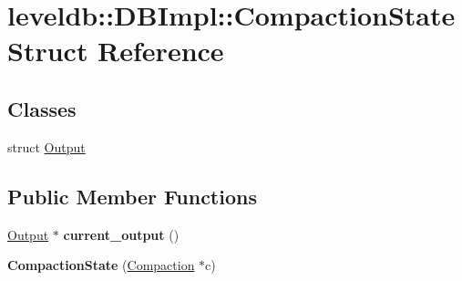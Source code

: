 \hypertarget{structleveldb_1_1_d_b_impl_1_1_compaction_state}{}\section{leveldb\+:\+:D\+B\+Impl\+:\+:Compaction\+State Struct Reference}
\label{structleveldb_1_1_d_b_impl_1_1_compaction_state}
\subsection*{Classes}
\begin{DoxyCompactItemize}
\item 
struct \mbox{\hyperlink{structleveldb_1_1_d_b_impl_1_1_compaction_state_1_1_output}{Output}}
\end{DoxyCompactItemize}
\subsection*{Public Member Functions}
\begin{DoxyCompactItemize}
\item 
\mbox{\label{structleveldb_1_1_d_b_impl_1_1_compaction_state_ac371d4a1422f4c1c122cfd39e97a6b95}} 
\mbox{\hyperlink{structleveldb_1_1_d_b_impl_1_1_compaction_state_1_1_output}{Output}} $\ast$ {\bfseries current\+\_\+output} ()
\item 
\mbox{\label{structleveldb_1_1_d_b_impl_1_1_compaction_state_a3f66a31afd7f73ef5021337d1ec626b6}} 
{\bfseries Compaction\+State} (\mbox{\hyperlink{classleveldb_1_1_compaction}{Compaction}} $\ast$c)
\end{DoxyCompactItemize}

